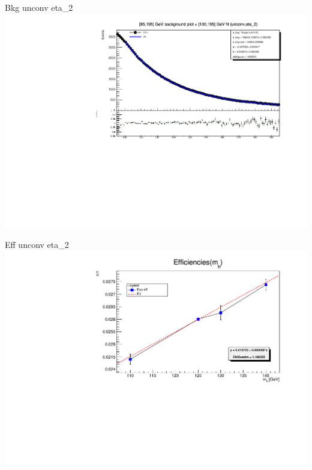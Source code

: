 \documentclass[10pt,UKenglish, leqno, xcolor = dvipsnames]{beamer}
\begin{document}
		\begin{frame}{Bkg unconv eta\_2}
			\vfill
			\centering
			\includegraphics[width=1.\textwidth]{../images/week_10/bkg_100_195GeV_fit_unconv_eta_2.pdf}
			\vfill
		\end{frame}
	
		\begin{frame}{Eff unconv eta\_2}
			\vfill
			\includegraphics[width=1.\textwidth]{../images/week_10/efficiencies_fit_unconv_eta_2.pdf}
			\vfill
		\end{frame}
	
\end{document}
